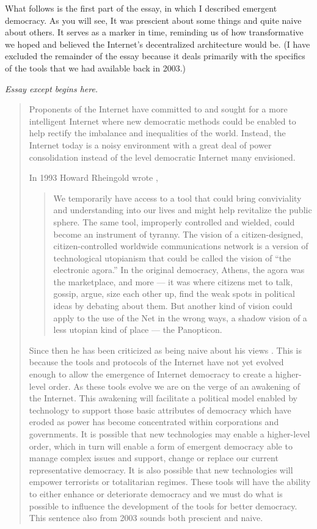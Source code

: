 What follows is the first part of the essay, in which I described emergent democracy. As you will see, It was prescient about some things and quite naive about others. It serves as a marker in time, reminding us of how transformative we hoped and believed the Internet's decentralized architecture would be. (I have excluded the remainder of the essay because it deals primarily with the specifics of the tools that we had available back in 2003.)

\textit{Essay except begins here.}

\begin{quote}
Proponents of the Internet have committed to and sought for a more intelligent Internet where new democratic methods could be enabled to help rectify the imbalance and inequalities of the world. Instead, the Internet today is a noisy environment with a great deal of power consolidation instead of the level democratic Internet many envisioned.

In 1993 Howard Rheingold wrote \cite{rheingold1993virtual},
\begin{quotation}
We temporarily have access to a tool that could bring conviviality and understanding into our lives and might help revitalize the public sphere. The same tool, improperly controlled and wielded, could become an instrument of tyranny. The vision of a citizen-designed, citizen-controlled worldwide communications network is a version of technological utopianism that could be called the vision of ``the electronic agora.'' In the original democracy, Athens, the agora was the marketplace, and more --- it was where citizens met to talk, gossip, argue, size each other up, find the weak spots in political ideas by debating about them. But another kind of vision could apply to the use of the Net in the wrong ways, a shadow vision of a less utopian kind of place --- the Panopticon.
\end{quotation}

Since then he has been criticized as being naive about his views \cite{rheingold2001virtual}. This is because the tools and protocols of the Internet have not yet evolved enough to allow the emergence of Internet democracy to create a higher-level order. As these tools evolve we are on the verge of an awakening of the Internet. This awakening will facilitate a political model enabled by technology to support those basic attributes of democracy which have eroded as power has become concentrated within corporations and governments. It is possible that new technologies may enable a higher-level order, which in turn will enable a form of emergent democracy able to manage complex issues and support, change or replace our current representative democracy. It is also possible that new technologies will empower terrorists or totalitarian regimes. These tools will have the ability to either enhance or deteriorate democracy and we must do what is possible to influence the development of the tools for better democracy. This sentence also from 2003 sounds both prescient and naive.


\end{quote}
